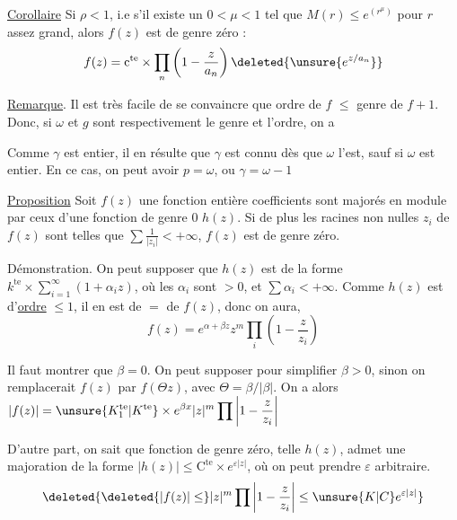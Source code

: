 \uline{Corollaire} \quad Si $\rho<1$, i.e s'il existe un $0<\mu<1$
tel que $M(r)\leq e^{(r^\mu)}$ pour $r$ assez grand,
alors $f(z)$ est de genre zéro :
\[
f(z)=\mathrm{c}^{\mathrm{te}}\mathbin{\times}\prod_n\left(1-\frac{z}{a_n}\right)\deleted{\unsure{e^{z/a_n}}}
\]

\uline{Remarque}. \quad Il est très facile de se convaincre
que \qquad ordre de $f$ $\leq$ genre de $f+1$. Donc, si $\omega$ et
$g$ sont respectivement le genre et l'ordre, on a
\begin{center}
\end{center}

Comme $\gamma$ est entier, il en résulte que $\gamma$
est connu dès que $\omega$ l'est, sauf si $\omega$ est
entier. En ce cas, on peut avoir $p=\omega$, ou
$\gamma=\omega-1$



\uline{Proposition} \quad Soit $f(z)$ une fonction entière      coefficients sont majorés en module par ceux d'une fonction de genre $0$ $h(z)$. Si de plus les racines non nulles $z_i$ de $f(z)$ sont telles que $\sum\frac{1}{|z_i|}<+\infty$, $f(z)$ est de genre zéro.


Démonstration. On peut supposer que $h(z)$ est de la forme $k^{\mathrm{te}}\times\sum_{i=1}^{\infty}(1+\alpha_i z)$, où les $\alpha_i$ sont $>0$, et $\sum\alpha_i<+\infty$. Comme $h(z)$ est d'\uline{ordre} $\leq1$, il en est de $=$ de $f(z)$, donc on aura,
\[
f(z)=e^{\alpha+\beta z}z^m\prod_i\left(1-\frac{z}{z_i}\right)
\]

Il faut montrer que $\beta=0$. On peut supposer pour simplifier $\beta>0$, sinon on remplacerait $f(z)$ par $f(\Theta z)$, avec $\Theta=\beta/|\beta|$. On a alors $\displaystyle |f(z)|=\unsure{K_1^{\mathrm{te}}|K^{\mathrm{te}}}\times e^{\beta x}|z|^m\prod\left|1-\frac{z}{z_i}\right|$

D'autre part, on sait que   fonction de genre zéro, telle $h(z)$, admet une majoration de la forme $|h(z)|\leq\mathrm C^{\mathrm{te}}\times e^{\varepsilon|z|}$, où on peut prendre $\varepsilon$ arbitraire. 
\[
\deleted{\deleted{|f(z)|\leq}|z|^m\prod\left|1-\frac{z}{z_i}\right|\leq\unsure{K|C}e^{\varepsilon|z|}}
\]


